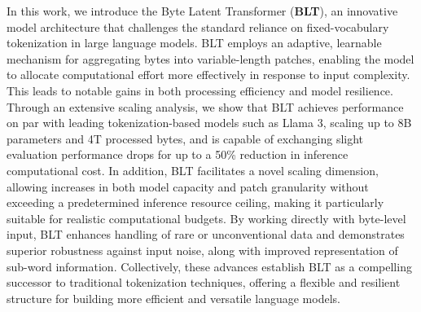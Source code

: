 In this work, we introduce the Byte Latent Transformer (\textbf{BLT}), an innovative model architecture that challenges the standard reliance on fixed-vocabulary tokenization in large language models. \textsc{BLT} employs an adaptive, learnable mechanism for aggregating bytes into variable-length patches, enabling the model to allocate computational effort more effectively in response to input complexity. This leads to notable gains in both processing efficiency and model resilience. Through an extensive scaling analysis, we show that \textsc{BLT} achieves performance on par with leading tokenization-based models such as Llama 3, scaling up to 8B parameters and 4T processed bytes, and is capable of exchanging slight evaluation performance drops for up to a 50\% reduction in inference computational cost. In addition, \textsc{BLT} facilitates a novel scaling dimension, allowing increases in both model capacity and patch granularity without exceeding a predetermined inference resource ceiling, making it particularly suitable for realistic computational budgets. By working directly with byte-level input, \textsc{BLT} enhances handling of rare or unconventional data and demonstrates superior robustness against input noise, along with improved representation of sub-word information. Collectively, these advances establish \textsc{BLT} as a compelling successor to traditional tokenization techniques, offering a flexible and resilient structure for building more efficient and versatile language models.

